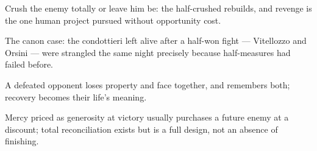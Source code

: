 

\begin{distilled}
  \item Crush the enemy totally or leave him be: the half-crushed rebuilds, and revenge is the one human project pursued without opportunity cost.
  \item The canon case: the condottieri left alive after a half-won fight --- Vitellozzo and Orsini --- were strangled the same night precisely because half-measures had failed before.
  \item A defeated opponent loses property and face together, and remembers both; recovery becomes their life's meaning.
  \item Mercy priced as generosity at victory usually purchases a future enemy at a discount; total reconciliation exists but is a full design, not an absence of finishing.
\end{distilled}
